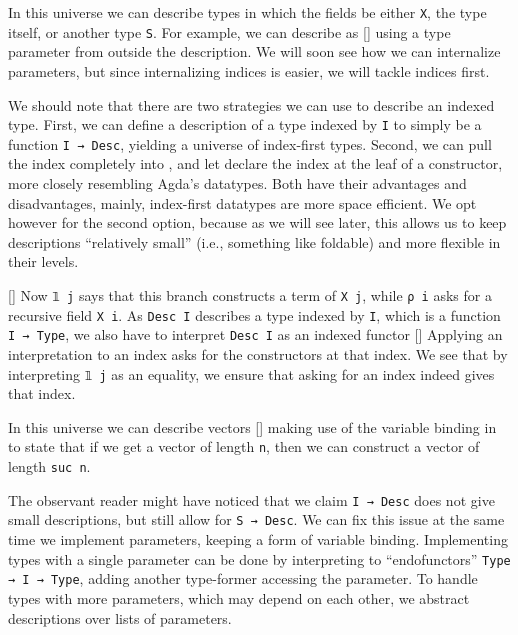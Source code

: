 In this universe we can describe types in which the fields be either \texttt{X}, the type itself, or another type \texttt{S}. For example, we can describe  as
[]
using a type parameter from outside the description. We will soon see how we can internalize parameters, but since internalizing indices is easier, we will tackle indices first.

We should note that there are two strategies we can use to describe an indexed type. First, we can define a description of a type indexed by \texttt{I} to simply be a function \texttt{I → Desc}, yielding a universe of index-first types. Second, we can pull the index completely into , and let  declare the index at the leaf of a constructor, more closely resembling Agda's datatypes. Both have their advantages and disadvantages, mainly, index-first datatypes are more space efficient. We opt however for the second option, because as we will see later, this allows us to keep descriptions ``relatively small'' (i.e., something like foldable) and more flexible in their levels.

[]
Now \texttt{𝟙 j} says that this branch constructs a term of \texttt{X j}, while \texttt{ρ i} asks for a recursive field \texttt{X i}. As \texttt{Desc I} describes a type indexed by \texttt{I}, which is a function \texttt{I → Type}, we also have to interpret \texttt{Desc I} as an indexed functor 
[]
Applying an interpretation to an index asks for the constructors at that index. We see that by interpreting \texttt{𝟙 j} as an equality, we ensure that asking for an index indeed gives that index.

In this universe we can describe vectors
[]
making use of the variable binding in  to state that if we get a vector of length \texttt{n}, then we can construct a vector of length \texttt{suc n}.

The observant reader might have noticed that we claim \texttt{I → Desc} does not give small descriptions, but still allow for \texttt{S → Desc}. We can fix this issue at the same time we implement parameters, keeping a form of variable binding. Implementing types with a single parameter can be done by interpreting to ``endofunctors'' \texttt{Type → I → Type}, adding another type-former accessing the parameter. To handle types with more parameters, which may depend on each other, we abstract descriptions over lists of parameters.

